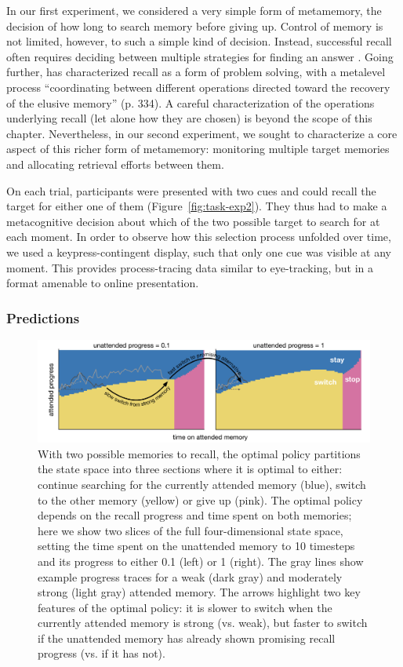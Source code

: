 In our first experiment, we considered a very simple form of metamemory, the decision of how long to search memory before giving up. Control of memory is not limited, however, to such a simple kind of decision. Instead, successful recall often requires deciding between multiple strategies for finding an answer \citep{reder1988strategic}. Going further, \citet{koriat2000control} has characterized recall as a form of problem solving, with a metalevel process ``coordinating between different operations directed toward the recovery of the elusive memory'' (p. 334). A careful characterization of the operations underlying recall (let alone how they are chosen) is beyond the scope of this chapter. Nevertheless, in our second experiment, we sought to characterize a core aspect of this richer form of metamemory: monitoring multiple target memories and allocating retrieval efforts between them. 

On each trial, participants were presented with two cues and could recall the target for either one of them (Figure~\ref{fig:task-exp2}). They thus had to make a metacognitive decision about which of the two possible target to search for at each moment. In order to observe how this selection process unfolded over time, we used a keypress-contingent display, such that only one cue was visible at any moment. This provides process-tracing data similar to eye-tracking, but in a format amenable to online presentation.

\subsubsection{Predictions}

\begin{figure}[t!]
  \centering
  \includegraphics[width=\textwidth]{figs/memory/exp2_predictions.pdf}
  \caption{ 
    With two possible memories to recall, the optimal policy partitions the state space into three sections where it is optimal to either: continue searching for the currently attended memory (blue), switch to the other memory (yellow) or give up (pink). The optimal policy depends on the recall progress and time spent on both memories; here we show two slices of the full four-dimensional state space, setting the time spent on the unattended memory to 10 timesteps and its progress to either 0.1 (left) or 1 (right). The gray lines show example progress traces for a weak (dark gray) and moderately strong (light gray) attended memory. The arrows highlight two key features of the optimal policy: it is slower to switch when the currently attended memory is strong (vs. weak), but faster to switch if the unattended memory has already shown promising recall progress (vs. if it has not).
  }
  \label{fig:exp2_predictions}
\end{figure}

